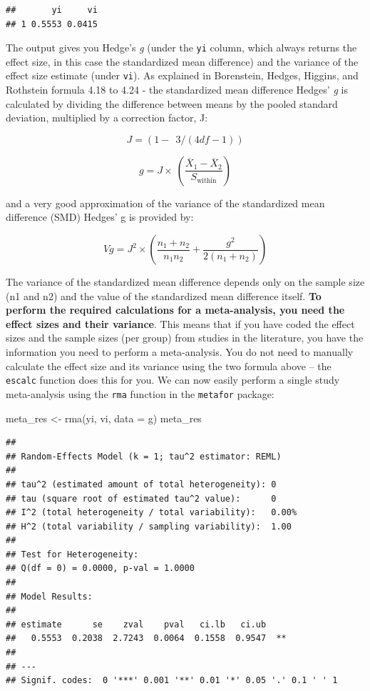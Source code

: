 \documentclass[
  oneside]{book}
\newenvironment{Shaded}{\begin{snugshade}}{\end{snugshade}}
\newcommand{\AttributeTok}[1]{\textcolor[rgb]{0.77,0.63,0.00}{#1}}
\newcommand{\FunctionTok}[1]{\textcolor[rgb]{0.00,0.00,0.00}{#1}}
\newcommand{\NormalTok}[1]{#1}
\newcommand{\OtherTok}[1]{\textcolor[rgb]{0.56,0.35,0.01}{#1}}
\begin{document}
\begin{verbatim}
##       yi     vi 
## 1 0.5553 0.0415
\end{verbatim}

The output gives you Hedge's \emph{g} (under the \texttt{yi} column, which always returns the effect size, in this case the standardized mean difference) and the variance of the effect size estimate (under \texttt{vi}). As explained in Borenstein, Hedges, Higgins, and Rothstein formula 4.18 to 4.24 -\citet{borenstein_introduction_2009} the standardized mean difference Hedges' \emph{g} is calculated by dividing the difference between means by the pooled standard deviation, multiplied by a correction factor, J:

\[
J = (1 - \ \ 3/(4df - 1))
\]

\[
g = J \times \ \left( \frac{{\overline{X}}_{1} - {\overline{X}}_{2}}{S_{\text{within}}} \right)
\]

and a very good approximation of the variance of the standardized mean
difference (SMD) Hedges' g is provided by:

\[
Vg = J^{2} \times \left( \frac{n_{1} + n_{2}}{n_{1}n_{2}} + \frac{g^{2}}{2(n_{1} + n_{2})} \right)
\]

The variance of the standardized mean difference depends only on the sample size (n1 and n2) and the value of the standardized mean difference itself. \textbf{To perform the required calculations for a meta-analysis, you need the effect sizes and their variance}. This means that if you have coded the effect sizes and the sample sizes (per group) from studies in the literature, you have the information you need to perform a meta-analysis. You do not need to manually calculate the effect size and its variance using the two formula above -- the \texttt{escalc} function does this for you. We can now easily perform a single study meta-analysis using the \texttt{rma} function in the \texttt{metafor} package:

\begin{Shaded}
\begin{Highlighting}[]
\NormalTok{meta\_res }\OtherTok{\textless{}{-}} \FunctionTok{rma}\NormalTok{(yi, vi, }\AttributeTok{data =}\NormalTok{ g)}
\NormalTok{meta\_res}
\end{Highlighting}
\end{Shaded}

\begin{verbatim}
## 
## Random-Effects Model (k = 1; tau^2 estimator: REML)
## 
## tau^2 (estimated amount of total heterogeneity): 0
## tau (square root of estimated tau^2 value):      0
## I^2 (total heterogeneity / total variability):   0.00%
## H^2 (total variability / sampling variability):  1.00
## 
## Test for Heterogeneity:
## Q(df = 0) = 0.0000, p-val = 1.0000
## 
## Model Results:
## 
## estimate      se    zval    pval   ci.lb   ci.ub 
##   0.5553  0.2038  2.7243  0.0064  0.1558  0.9547  ** 
## 
## ---
## Signif. codes:  0 '***' 0.001 '**' 0.01 '*' 0.05 '.' 0.1 ' ' 1
\end{verbatim}
\end{document}
